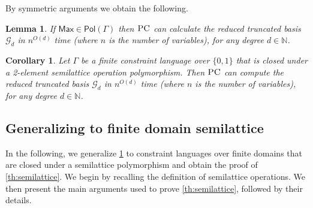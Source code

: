 \documentclass[11pt]{article}
\newcommand{\Pol}{\textsf{Pol}}
\newcommand{\PC}{\textsc{PC}}
\newcommand{\Max}{\textsf{Max}}
\newcommand{\1}{\textbf{1}}
\newcommand{\GB}{\text{Gr\"{o}bner} }
\newtheorem{lemma}[theorem]{Lemma}
\newtheorem{corollary}[theorem]{Corollary}
\begin{document}
By symmetric arguments we obtain the following.
\begin{lemma}\label{th:Max}
If $\Max\in\Pol(\Gamma)$ then $\PC$ can calculate the reduced truncated basis \GB $\mathcal{G}_d$ in $n^{O(d)}$ time (where $n$ is the number of variables), for any degree $d\in \mathbb{N}$.
\end{lemma}
\begin{corollary}\label{th:2semilattice}
    Let $\Gamma$ be a finite constraint language over $\{0, 1\}$ that is closed under  a 2-element semilattice operation polymorphism. Then $\PC$ can compute the reduced truncated \GB basis $\mathcal{G}_d$ in $n^{O(d)}$ time (where $n$ is the number of variables), for any degree $d\in \mathbb{N}$.
\end{corollary}



\subsection{Generalizing to finite domain semilattice}
In the following, we generalize \cref{th:2semilattice} to constraint languages over finite domains that are closed under a semilattice polymorphism and obtain the proof of \cref{th:semilattice}. We begin by recalling the definition of semilattice operations. We then present the main arguments used to prove \cref{th:semilattice}, followed by their details.

\end{document}
